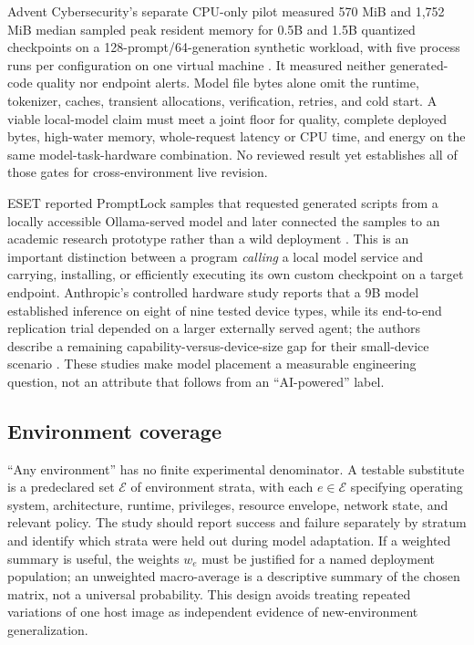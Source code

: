 \documentclass[11pt,letterpaper]{article}
\begin{document}
Advent Cybersecurity's separate CPU-only pilot measured 570 MiB and 1,752 MiB median sampled peak resident memory for 0.5B and 1.5B quantized checkpoints on a 128-prompt/64-generation synthetic workload, with five process runs per configuration on one virtual machine \cite{adventpilot}. It measured neither generated-code quality nor endpoint alerts. Model file bytes alone omit the runtime, tokenizer, caches, transient allocations, verification, retries, and cold start. A viable local-model claim must meet a joint floor for quality, complete deployed bytes, high-water memory, whole-request latency or CPU time, and energy on the same model-task-hardware combination. No reviewed result yet establishes all of those gates for cross-environment live revision.

ESET reported PromptLock samples that requested generated scripts from a locally accessible Ollama-served model and later connected the samples to an academic research prototype rather than a wild deployment \cite{esetpromptlock}. This is an important distinction between a program \emph{calling} a local model service and carrying, installing, or efficiently executing its own custom checkpoint on a target endpoint. Anthropic's controlled hardware study reports that a 9B model established inference on eight of nine tested device types, while its end-to-end replication trial depended on a larger externally served agent; the authors describe a remaining capability-versus-device-size gap for their small-device scenario \cite{anthropicreplication}. These studies make model placement a measurable engineering question, not an attribute that follows from an ``AI-powered'' label.

\subsection{Environment coverage}

``Any environment'' has no finite experimental denominator. A testable substitute is a predeclared set $\mathcal{E}$ of environment strata, with each $e\in\mathcal{E}$ specifying operating system, architecture, runtime, privileges, resource envelope, network state, and relevant policy. The study should report success and failure separately by stratum and identify which strata were held out during model adaptation. If a weighted summary is useful, the weights $w_e$ must be justified for a named deployment population; an unweighted macro-average is a descriptive summary of the chosen matrix, not a universal probability. This design avoids treating repeated variations of one host image as independent evidence of new-environment generalization.
\end{document}
